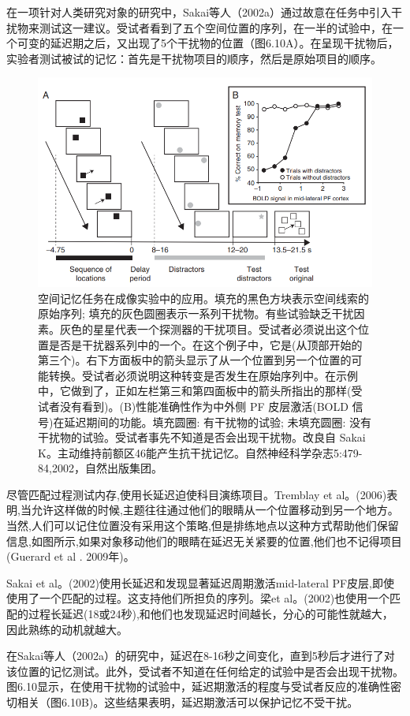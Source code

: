 在一项针对人类研究对象的研究中，Sakai等人（2002a）通过故意在任务中引入干扰物来测试这一建议。受试者看到了五个空间位置的序列，在一半的试验中，在一个可变的延迟期之后，又出现了5个干扰物的位置（图6.10A）。在呈现干扰物后，实验者测试被试的记忆：首先是干扰物项目的顺序，然后是原始项目的顺序。
\begin{figure}
	\centering
	\includegraphics[width=0.6\linewidth]{image_pfc/Fig_6_10}
	\caption{空间记忆任务在成像实验中的应用。填充的黑色方块表示空间线索的原始序列; 填充的灰色圆圈表示一系列干扰物。有些试验缺乏干扰因素。灰色的星星代表一个探测器的干扰项目。受试者必须说出这个位置是否是干扰器系列中的一个。在这个例子中，它是(从顶部开始的第三个)。右下方面板中的箭头显示了从一个位置到另一个位置的可能转换。受试者必须说明这种转变是否发生在原始序列中。在示例中，它做到了，正如左栏第三和第四面板中的箭头所指出的那样(受试者没有看到)。(B)性能准确性作为中外侧 PF 皮层激活(BOLD 信号)在延迟期间的功能。填充圆圈: 有干扰物的试验; 未填充圆圈: 没有干扰物的试验。受试者事先不知道是否会出现干扰物。改良自 Sakai K。主动维持前额区46能产生抗干扰记忆。自然神经科学杂志5:479-84,2002，自然出版集团。}
	\label{fig:fig}
\end{figure}
尽管匹配过程测试内存,使用长延迟迫使科目演练项目。Tremblay et al。(2006)表明,当允许这样做的时候,主题往往通过他们的眼睛从一个位置移动到另一个地方。当然,人们可以记住位置没有采用这个策略,但是排练地点以这种方式帮助他们保留信息,如图所示,如果对象移动他们的眼睛在延迟无关紧要的位置,他们也不记得项目(Guerard et al . 2009年)。

Sakai et al。(2002)使用长延迟和发现显著延迟周期激活mid-lateral PF皮层,即使使用了一个匹配的过程。这支持他们所担负的序列。梁et al。(2002)也使用一个匹配的过程长延迟(18或24秒),和他们也发现延迟时间越长，分心的可能性就越大，因此熟练的动机就越大。

在Sakai等人（2002a）的研究中，延迟在8-16秒之间变化，直到5秒后才进行了对该位置的记忆测试。此外，受试者不知道在任何给定的试验中是否会出现干扰物。图6.10显示，在使用干扰物的试验中，延迟期激活的程度与受试者反应的准确性密切相关（图6.10B)。这些结果表明，延迟期激活可以保护记忆不受干扰。

